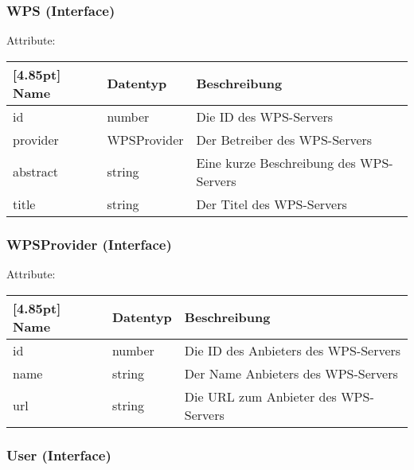     		\subsubsection{WPS (Interface)}
    		
    		Attribute:
            \begin{center}
            	\renewcommand{\arraystretch}{1.5}
                \setlength\tabcolsep{5pt}
            	\begin{tabularx}{\textwidth}{|l|l|X|}
            		\hline
                    \rowcolor[gray]{0.75}[4.85pt]            		
                    Name & Datentyp & Beschreibung \\ \hline
            		id & number & Die ID des WPS-Servers \\ \hline
            		provider & WPSProvider & Der Betreiber des WPS-Servers \\ \hline
            		abstract & string & Eine kurze Beschreibung des WPS-Servers \\ \hline
            		title & string & Der Titel des WPS-Servers \\ \hline
            	\end{tabularx}
            \end{center}
                
    		\subsubsection{WPSProvider (Interface)}
    		
    		Attribute:
            \begin{center}
            	\renewcommand{\arraystretch}{1.5}
                \setlength\tabcolsep{5pt}
            	\begin{tabularx}{\textwidth}{|l|l|X|}
            		\hline
                    \rowcolor[gray]{0.75}[4.85pt]            		
                    Name & Datentyp & Beschreibung \\ \hline
            		id & number & Die ID des Anbieters des WPS-Servers  \\ \hline
            		name & string & Der Name Anbieters des WPS-Servers \\ \hline
            		url & string & Die URL zum Anbieter des WPS-Servers \\ \hline
            	\end{tabularx}
            \end{center}
                
    		\subsubsection{User (Interface)}
            
